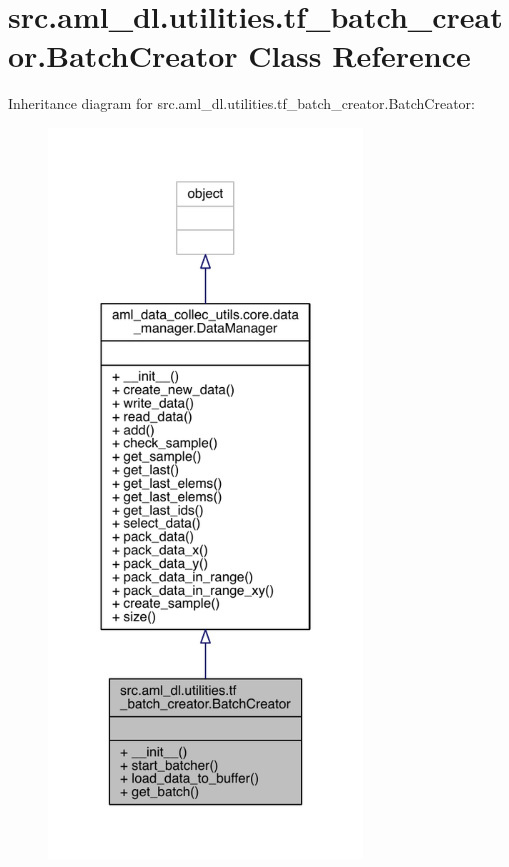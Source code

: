 \hypertarget{classsrc_1_1aml__dl_1_1utilities_1_1tf__batch__creator_1_1_batch_creator}{}\section{src.\+aml\+\_\+dl.\+utilities.\+tf\+\_\+batch\+\_\+creator.\+Batch\+Creator Class Reference}
\label{classsrc_1_1aml__dl_1_1utilities_1_1tf__batch__creator_1_1_batch_creator}


Inheritance diagram for src.\+aml\+\_\+dl.\+utilities.\+tf\+\_\+batch\+\_\+creator.\+Batch\+Creator\+:
\nopagebreak
\begin{figure}[H]
\begin{center}
\leavevmode
\includegraphics[width=236pt]{classsrc_1_1aml__dl_1_1utilities_1_1tf__batch__creator_1_1_batch_creator__inherit__graph}
\end{center}
\end{figure}


